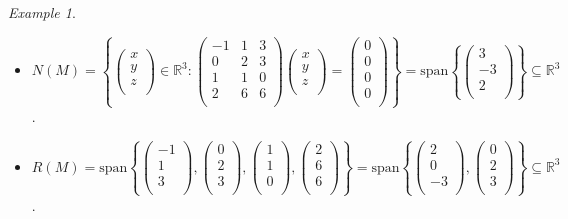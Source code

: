 \documentclass{article}
\theoremstyle{remark}
\newtheorem{example}[theorem]{Example}
\newcommand\spans{\mathrm{span}}
\begin{document}
\begin{example}
\begin{itemize}
            \item $N(M)=\left\{\begin{pmatrix}x\\y\\z\\\end{pmatrix}\in\mathbb{R}^3:\begin{pmatrix}-1&1&3\\0&2&3\\1&1&0\\2&6&6\\\end{pmatrix}\begin{pmatrix}x\\y\\z\\\end{pmatrix}=\begin{pmatrix}0\\0\\0\\0\\\end{pmatrix}\right\}=\spans\left\{\begin{pmatrix}3\\-3\\2\\\end{pmatrix}\right\}\subseteq\mathbb{R}^3$.
            \item $R(M)=\spans\left\{\begin{pmatrix}-1\\1\\3\\\end{pmatrix},\begin{pmatrix}0\\2\\3\\\end{pmatrix},\begin{pmatrix}1\\1\\0\\\end{pmatrix},\begin{pmatrix}2\\6\\6\\\end{pmatrix}\right\}=\spans\left\{\begin{pmatrix}2\\0\\-3\\\end{pmatrix},\begin{pmatrix}0\\2\\3\\\end{pmatrix}\right\}\subseteq\mathbb{R}^3$.

\end{itemize}
\end{example}
\end{document}
